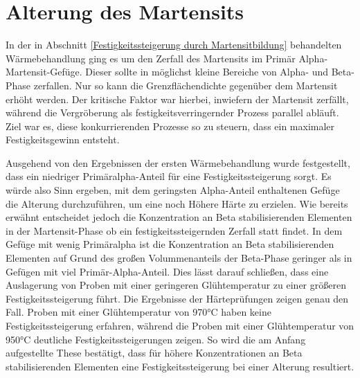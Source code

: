 \documentclass[a4paper, 11pt]{tubsreprt}
\begin{document}
\section{Alterung des Martensits}
In der in Abschnitt \ref{Festigkeitssteigerung durch Martensitbildung} behandelten Wärmebehandlung ging es um den Zerfall des Martensits im Primär Alpha-Martensit-Gefüge. Dieser sollte in möglichst kleine Bereiche von Alpha- und Beta-Phase zerfallen. Nur so kann die Grenzflächendichte gegenüber dem Martensit erhöht werden. Der kritische Faktor war hierbei, inwiefern der Martensit zerfällt, während die Vergröberung als festigkeitsverringernder Prozess parallel abläuft. Ziel war es, diese konkurrierenden Prozesse so zu steuern, dass ein maximaler Festigkeitsgewinn entsteht. 

Ausgehend von den Ergebnissen der ersten Wärmebehandlung wurde festgestellt, dass ein niedriger Primäralpha-Anteil für eine Festigkeitssteigerung sorgt. Es würde also Sinn ergeben, mit dem geringsten Alpha-Anteil enthaltenen Gefüge die Alterung durchzuführen, um eine noch Höhere Härte zu erzielen. Wie bereits erwähnt entscheidet jedoch die Konzentration an Beta stabilisierenden Elementen in der Martensit-Phase ob ein festigkeitssteigernden Zerfall statt findet. In dem Gefüge mit wenig Primäralpha ist die Konzentration an Beta stabilisierenden Elementen auf Grund des großen Volummenanteils der Beta-Phase geringer als in Gefügen mit viel Primär-Alpha-Anteil. Dies lässt darauf schließen, dass eine Auslagerung von Proben mit einer geringeren Glühtemperatur zu einer größeren Festigkeitssteigerung führt. Die Ergebnisse der Härteprüfungen zeigen genau den Fall. Proben mit einer Glühtemperatur von 970°C haben keine Festigkeitssteigerung erfahren, während die Proben mit einer Glühtemperatur von 950°C deutliche Festigkeitssteigerungen zeigen. So wird die am Anfang aufgestellte These bestätigt, dass für höhere Konzentrationen an Beta stabilisierenden Elementen eine Festigkeitssteigerung bei einer Alterung resultiert. 
\end{document}
